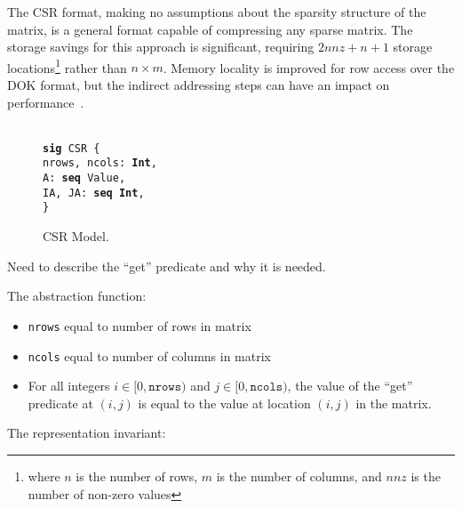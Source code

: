 \documentclass[11pt,conference]{IEEEtran}
\newenvironment{myquote}{\list{}{\leftmargin=12pt\rightmargin=0pt}\item[]}{\endlist}
\def\TA{\makebox[12pt]{}}
\def\Bsig{\textbf{sig} }
\def\Bseq{\textbf{seq} }
\def\Bint{\textbf{Int}}
\begin{document}
The CSR format, making no assumptions about the sparsity structure of the matrix, is a general format capable of compressing any sparse matrix.  The storage savings for this approach is significant, requiring $2nnz+n+1$ storage locations\footnote{where $n$ is the number of rows, $m$ is the number of columns, and $nnz$ is the number of non-zero values} rather than $n \times m$.  Memory locality is improved for row access over the DOK format, but the indirect addressing steps can have an impact on performance~\cite{bai}.

\begin{figure}
\centering
\begin{myquote}\small{\texttt{\\
\Bsig CSR \{\\
\TA  nrows, ncols: \Bint,\\
\TA  A: \Bseq Value,\\
\TA  IA, JA: \Bseq \Bint,\\
\}
}}
\end{myquote}
\caption{CSR Model.}
\label{model:csr}
\end{figure}

Need to describe the ``get'' predicate and why it is needed.

The abstraction function:

\begin{itemize}
  \item \texttt{nrows} equal to number of rows in matrix
  \item \texttt{ncols} equal to number of columns in matrix
  \item For all integers $i \in [0, \texttt{nrows})$ and $j \in [0, \texttt{ncols})$, the value of the ``get'' predicate at \((i, j)\) is equal to the value at location \((i, j)\) in the matrix.
\end{itemize}

The representation invariant:
\end{document}
